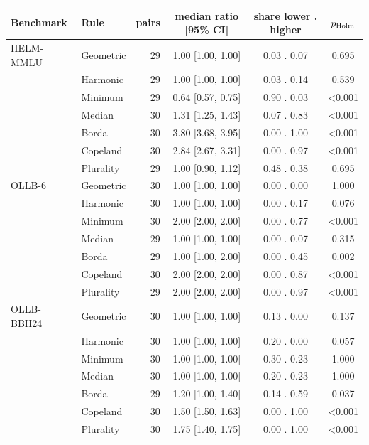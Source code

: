 \begin{tabular}{llrccc}\toprule
Benchmark & Rule & pairs & median ratio [95\% CI] & share lower . higher & $p_{\rm Holm}$\\\midrule
HELM-MMLU & Geometric & 29 & 1.00 [1.00, 1.00] & 0.03 . 0.07 & 0.695\\
 & Harmonic & 29 & 1.00 [1.00, 1.00] & 0.03 . 0.14 & 0.539\\
 & Minimum & 29 & 0.64 [0.57, 0.75] & 0.90 . 0.03 & <0.001\\
 & Median & 30 & 1.31 [1.25, 1.43] & 0.07 . 0.83 & <0.001\\
 & Borda & 30 & 3.80 [3.68, 3.95] & 0.00 . 1.00 & <0.001\\
 & Copeland & 30 & 2.84 [2.67, 3.31] & 0.00 . 0.97 & <0.001\\
 & Plurality & 29 & 1.00 [0.90, 1.12] & 0.48 . 0.38 & 0.695\\
\midrule
OLLB-6 & Geometric & 30 & 1.00 [1.00, 1.00] & 0.00 . 0.00 & 1.000\\
 & Harmonic & 30 & 1.00 [1.00, 1.00] & 0.00 . 0.17 & 0.076\\
 & Minimum & 30 & 2.00 [2.00, 2.00] & 0.00 . 0.77 & <0.001\\
 & Median & 29 & 1.00 [1.00, 1.00] & 0.00 . 0.07 & 0.315\\
 & Borda & 29 & 1.00 [1.00, 2.00] & 0.00 . 0.45 & 0.002\\
 & Copeland & 30 & 2.00 [2.00, 2.00] & 0.00 . 0.87 & <0.001\\
 & Plurality & 29 & 2.00 [2.00, 2.00] & 0.00 . 0.97 & <0.001\\
\midrule
OLLB-BBH24 & Geometric & 30 & 1.00 [1.00, 1.00] & 0.13 . 0.00 & 0.137\\
 & Harmonic & 30 & 1.00 [1.00, 1.00] & 0.20 . 0.00 & 0.057\\
 & Minimum & 30 & 1.00 [1.00, 1.00] & 0.30 . 0.23 & 1.000\\
 & Median & 30 & 1.00 [1.00, 1.00] & 0.20 . 0.23 & 1.000\\
 & Borda & 29 & 1.20 [1.00, 1.40] & 0.14 . 0.59 & 0.037\\
 & Copeland & 30 & 1.50 [1.50, 1.63] & 0.00 . 1.00 & <0.001\\
 & Plurality & 30 & 1.75 [1.40, 1.75] & 0.00 . 1.00 & <0.001\\
\bottomrule\end{tabular}
